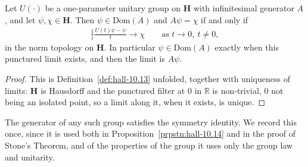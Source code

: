 \begin{lemma}
    \label{lmm:generator-spec}
    \leanok
    Let $U(\cdot)$ be a one-parameter unitary group on $\mathbf{H}$ with infinitesimal generator $A$, and let $\psi, \chi \in \mathbf{H}$. Then $\psi \in \text{Dom}(A)$ and $A\psi = \chi$ if and only if
    \begin{align}
        \frac{1}{i} \frac{U(t)\psi - \psi}{t} \longrightarrow \chi \qquad \text{as } t \rightarrow 0,\ t \ne 0,
    \end{align}
    in the norm topology on $\mathbf{H}$. In particular $\psi \in \text{Dom}(A)$ exactly when this punctured limit exists, and then the limit is $A\psi$.
\end{lemma}
\begin{proof}
    \leanok
This is Definition~\ref{def:hall-10.13} unfolded, together with uniqueness of limits: $\mathbf{H}$ is Hausdorff and the punctured filter at $0$ in $\mathbb{R}$ is non-trivial, $0$ not being an isolated point, so a limit along it, when it exists, is unique.
\end{proof}

The generator of any such group satisfies the symmetry identity. We record this once, since it is used both in Proposition~\ref{prpstn:hall-10.14} and in the proof of Stone's Theorem, and of the properties of the group it uses only the group law and unitarity.

